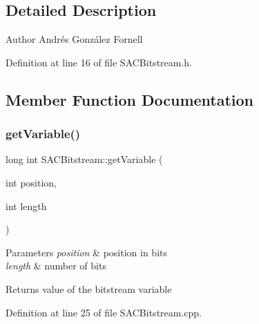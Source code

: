 \subsection{Detailed Description}
\begin{DoxyAuthor}{Author}
Andrés González Fornell 
\end{DoxyAuthor}


Definition at line 16 of file S\+A\+C\+Bitstream.\+h.



\subsection{Member Function Documentation}
\mbox{\label{class_s_a_c_bitstream_ad0f39852ca2853efa15be087ce68c3b9}} 
\subsubsection{\texorpdfstring{get\+Variable()}{getVariable()}}
{\footnotesize\ttfamily long int S\+A\+C\+Bitstream\+::get\+Variable (\begin{DoxyParamCaption}\item[{int}]{position,  }\item[{int}]{length }\end{DoxyParamCaption})}


\begin{DoxyParams}{Parameters}
{\em position} & position in bits \\
\hline
{\em length} & number of bits \\
\hline
\end{DoxyParams}
\begin{DoxyReturn}{Returns}
value of the bitstream variable 
\end{DoxyReturn}


Definition at line 25 of file S\+A\+C\+Bitstream.\+cpp.

